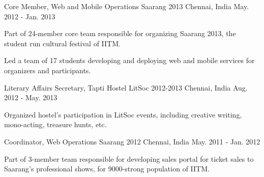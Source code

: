 \begin{cventries}
	\cventry
	{Core Member, Web and Mobile Operations}
	{Saarang 2013}
	{Chennai, India}
	{May. 2012 - Jan. 2013}
	{
		\begin{cvitems}
			\item{Part of 24-member core team responsible for organizing Saarang 2013, the student run cultural festival of IITM.}
			\item{Led a team of 17 students developing and deploying web and mobile services for organizers and participants.}
		\end{cvitems}
	}

	\cventry
	{Literary Affairs Secretary, Tapti Hostel}
	{LitSoc 2012-2013}
	{Chennai, India}
	{Aug. 2012 - May. 2013}
	{
		\begin{cvitems}
			\item{Organized hostel's participation in LitSoc events, including creative writing, mono-acting, treasure hunts, etc.}
		\end{cvitems}
	}

	\cventry
	{Coordinator, Web Operations}
	{Saarang 2012}
	{Chennai, India}
	{May. 2011 - Jan. 2012}
	{
		\begin{cvitems}
			\item{Part of 3-member team responsible for developing sales portal for ticket sales to Saarang's professional shows, for 9000-strong population of IITM.}
		\end{cvitems}
	}

\end{cventries}
